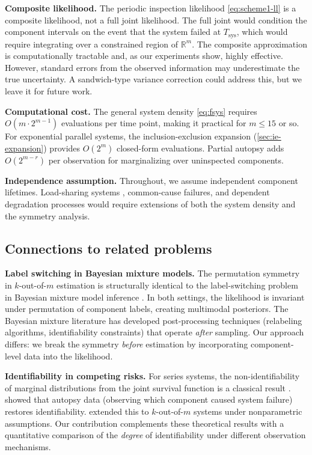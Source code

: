 \documentclass[12pt]{article}
\newcommand{\Tsys}{T_{\mathrm{sys}}}
\begin{document}
\textbf{Composite likelihood.}
The periodic inspection likelihood \eqref{eq:scheme1-ll} is a composite
likelihood, not a full joint likelihood.  The full joint would condition
the component intervals on the event that the system failed at $\Tsys$,
which would require integrating over a constrained region of
$\mathbb{R}^m$.  The composite approximation is computationally
tractable and, as our experiments show, highly effective.  However,
standard errors from the observed information may underestimate the
true uncertainty.  A sandwich-type variance correction
\citep{VarinReidFirth2011} could address this, but we leave it for
future work.

\textbf{Computational cost.}
The general system density \eqref{eq:fsys} requires $O(m \cdot 2^{m-1})$
evaluations per time point, making it practical for $m \leq 15$ or so.
For exponential parallel systems, the inclusion-exclusion expansion
(\cref{sec:ie-expansion}) provides $O(2^m)$ closed-form evaluations.
Partial autopsy adds $O(2^{m-r})$ per observation for marginalizing over
uninspected components.

\textbf{Independence assumption.}
Throughout, we assume independent component lifetimes.  Load-sharing
systems \citep{Park2013}, common-cause failures, and dependent degradation
processes would require extensions of both the system density and the
symmetry analysis.

\subsection{Connections to related problems}\label{sec:connections}

\textbf{Label switching in Bayesian mixture models.}
The permutation symmetry in $k$-out-of-$m$ estimation is structurally
identical to the label-switching problem in Bayesian mixture model inference
\citep{Stephens2000, JasraHolmesStephens2005}.  In both settings,
the likelihood is invariant under permutation of component labels, creating
multimodal posteriors.  The Bayesian mixture literature has developed
post-processing techniques (relabeling algorithms, identifiability
constraints) that operate \emph{after} sampling.  Our approach differs:
we break the symmetry \emph{before} estimation by incorporating
component-level data into the likelihood.

\textbf{Identifiability in competing risks.}
For series systems, the non-identifiability of marginal distributions from
the joint survival function is a classical result \citep{Tsiatis1975,
Cox1959}.  \citet{Meilijson1981} showed that autopsy data (observing which
component caused system failure) restores identifiability.
\citet{Komarova2017} extended this to $k$-out-of-$m$ systems under
nonparametric assumptions.  Our contribution complements these theoretical
results with a quantitative comparison of the \emph{degree} of identifiability
under different observation mechanisms.
\end{document}
